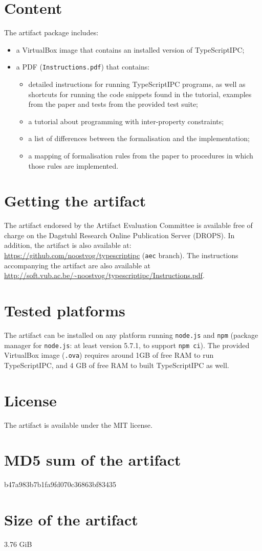 \documentclass[a4paper,UKenglish]{darts-v2018}
\newenvironment{content}{\section{Content}}{}
\newenvironment{getting}{\section{Getting the artifact} The artifact 
endorsed by the Artifact Evaluation Committee is available free of 
charge on the Dagstuhl Research Online Publication Server (DROPS).}{}
\newenvironment{platforms}{\section{Tested platforms}}{}
\newcommand{\license}[1]{{\section{License}#1}}
\newcommand{\mdsum}[1]{{\section{MD5 sum of the artifact}#1}}
\newcommand{\artifactsize}[1]{{\section{Size of the artifact}#1}}
\begin{document}
\begin{content}
The artifact package includes:
\begin{itemize}
\item a VirtualBox image that contains an installed version of TypeScriptIPC;
\item a PDF (\texttt{Instructions.pdf}) that contains:
\begin{itemize}
\item detailed instructions for running TypeScriptIPC programs, as well as shortcuts for running the code snippets found in the tutorial, examples from the paper and tests from the provided test suite;
\item a tutorial about programming with inter-property constraints;
\item a list of differences between the formalisation and the implementation;
\item a mapping of formalisation rules from the paper to procedures in which those rules are implemented.
\end{itemize}
\end{itemize}
\end{content}

\begin{getting}
In addition, the artifact is also available at:
\url{https://github.com/noostvog/typescriptipc} (\texttt{aec} branch).
The instructions accompanying the artifact are also available at \url{http://soft.vub.ac.be/~noostvog/typescriptipc/Instructions.pdf}.
\end{getting}

\begin{platforms}
The artifact can be installed on any platform running \texttt{node.js} and \texttt{npm} (package manager for \texttt{node.js}: at least version 5.7.1, to support \texttt{npm ci}).
The provided VirtualBox image (\texttt{.ova}) requires around 1GB of free RAM to run TypeScriptIPC, and 4 GB of free RAM to built TypeScriptIPC as well.
\end{platforms}

\license{The artifact is available under the MIT license.}

\mdsum{b47a983b7b1fa9fd070c36863bf83435}

\artifactsize{3.76 GiB}
\end{document}

